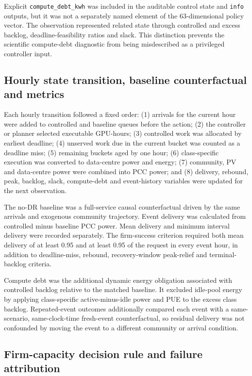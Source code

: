 \documentclass[10pt,a4paper]{article}
\begin{document}
Explicit \nolinkurl{compute_debt_kwh} was included in the auditable control state and \nolinkurl{info} outputs, but it was not a separately named element of the 63-dimensional policy vector. The observation represented related state through controlled and excess backlog, deadline-feasibility ratios and slack. This distinction prevents the scientific compute-debt diagnostic from being misdescribed as a privileged controller input.


\subsection{Hourly state transition, baseline counterfactual and metrics}

Each hourly transition followed a fixed order: (1) arrivals for the current hour were added to controlled and baseline queues before the action; (2) the controller or planner selected executable GPU-hours; (3) controlled work was allocated by earliest deadline; (4) unserved work due in the current bucket was counted as a deadline miss; (5) remaining buckets aged by one hour; (6) class-specific execution was converted to data-centre power and energy; (7) community, PV and data-centre power were combined into PCC power; and (8) delivery, rebound, peak, backlog, slack, compute-debt and event-history variables were updated for the next observation.


The no-DR baseline was a full-service causal counterfactual driven by the same arrivals and exogenous community trajectory. Event delivery was calculated from controlled minus baseline PCC power. Mean delivery and minimum interval delivery were recorded separately. The firm-success criterion required both mean delivery of at least 0.95 and at least 0.95 of the request in every event hour, in addition to deadline-miss, rebound, recovery-window peak-relief and terminal-backlog criteria.


Compute debt was the additional dynamic energy obligation associated with controlled backlog relative to the matched baseline. It excluded idle-pool energy by applying class-specific active-minus-idle power and PUE to the excess class backlog. Repeated-event outcomes additionally compared each event with a same-scenario, same-clock-time fresh-event counterfactual, so residual delivery was not confounded by moving the event to a different community or arrival condition.


\subsection{Firm-capacity decision rule and failure attribution}
\end{document}
